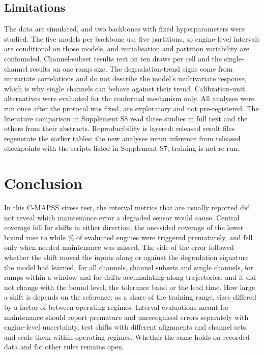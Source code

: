 \subsection{Limitations}
The data are simulated, and two backbones with fixed hyperparameters were studied. The five models per backbone use five partitions, so engine-level intervals are conditional on those models, and initialisation and partition variability are confounded. Channel-subset results rest on ten draws per cell and the single-channel results on one ramp size. The degradation-trend signs come from univariate correlations and do not describe the model's multivariate response, which is why single channels can behave against their trend. Calibration-unit alternatives were evaluated for the conformal mechanism only. All analyses were run once after the protocol was fixed, are exploratory and not pre-registered. The literature comparison in Supplement S8 read three studies in full text and the others from their abstracts. Reproducibility is layered: released result files regenerate the earlier tables; the new analyses rerun inference from released checkpoints with the scripts listed in Supplement S7; training is not re-run.

\section{Conclusion}
In this C-MAPSS stress test, the interval metrics that are usually reported did not reveal which maintenance error a degraded sensor would cause. Central coverage fell for shifts in either direction; the one-sided coverage of the lower bound rose to \RVCovTwo{} while \RVPremTwo\% of evaluated engines were triggered prematurely, and fell only when needed maintenance was missed. The side of the error followed whether the shift moved the inputs along or against the degradation signature the model had learned, for all channels, channel subsets and single channels, for ramps within a window and for drifts accumulating along trajectories, and it did not change with the bound level, the tolerance band or the lead time. How large a shift is depends on the reference: as a share of the training range, sizes differed by a factor of \RVRatioSix{} between operating regimes. Interval evaluations meant for maintenance should report premature and unrecognised errors separately with engine-level uncertainty, test shifts with different alignments and channel sets, and scale them within operating regimes. Whether the same holds on recorded data and for other rules remains open.

